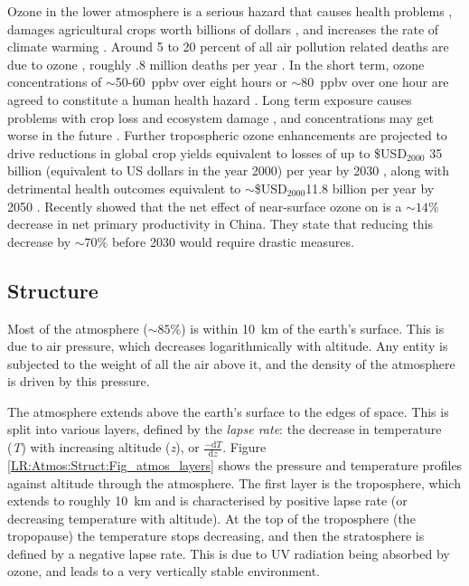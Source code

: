   Ozone in the lower atmosphere is a serious hazard that causes health problems \parencite{Hsieh2013}, damages agricultural crops worth billions of dollars \parencite{Avnery2011,Yue2017}, and increases the rate of climate warming \parencite{IPCC_2013_chap8}.
  Around 5 to 20 percent of all air pollution related deaths are due to ozone \parencite{Monks2015}, roughly .8 million deaths per year \parencite{Lelieveld2013}.
  In the short term, ozone concentrations of $\sim$50-60~ppbv over eight hours or $\sim$80~ppbv over one hour are agreed to constitute a human health hazard \parencite{Ayers2006,Lelieveld2009}. 
  Long term exposure causes problems with crop loss and ecosystem damage \parencite{Emberson2003}, and concentrations may get worse in the future \parencite{Lelieveld2009, Stevenson2013}.
  Further tropospheric ozone enhancements are projected to drive reductions in global crop yields equivalent to losses of up to \$USD$_{2000}$ 35 billion (equivalent to US dollars in the year 2000) per year by 2030 \parencite{Avnery2011}, along with detrimental health outcomes equivalent to $\sim$\$USD$_{2000}$11.8 billion per year by 2050 \parencite{Selin2009}.
  Recently \textcite{Yue2017} showed that the net effect of near-surface ozone on is a $\sim 14\%$ decrease in net primary productivity in China.
  They state that reducing this decrease by $\sim 70\%$ before 2030 would require drastic measures.
  
  
  \subsection{Structure}
  \label{LR:Atmos:Struct}
    
    Most of the atmosphere ($\sim 85\%$) is within 10~km of the earth's surface.
    This is due to air pressure, which decreases logarithmically with altitude.
    Any entity is subjected to the weight of all the air above it, and the density of the atmosphere is driven by this pressure.
    
    The atmosphere extends above the earth's surface to the edges of space. 
    This is split into various layers, defined by the \textit{lapse rate}: the decrease in temperature (\textit{T}) with increasing altitude (\textit{z}), or $\frac{-\textrm{d}T}{\textrm{d}z}$.
    Figure \ref{LR:Atmos:Struct:Fig_atmos_layers} shows the pressure and temperature profiles against altitude through the atmosphere.
    The first layer is the troposphere, which extends to roughly 10~km and is characterised by positive lapse rate (or decreasing temperature with altitude).
    At the top of the troposphere (the tropopause) the temperature stops decreasing, and then the stratosphere is defined by a negative lapse rate.
    This is due to UV radiation being absorbed by ozone, and leads to a very vertically stable environment.
    

